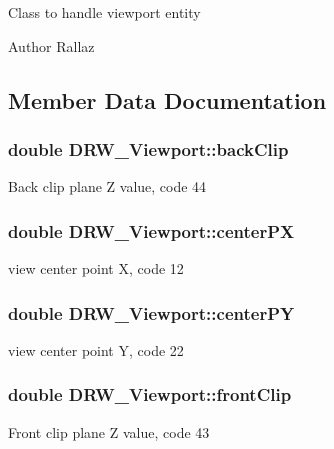 Class to handle viewport entity \begin{DoxyAuthor}{Author}
Rallaz 
\end{DoxyAuthor}


\subsection{Member Data Documentation}
\hypertarget{class_d_r_w___viewport_ac43573ecf6007bc2a5223465ab0d3dc0}{}
\subsubsection[{back\+Clip}]{\setlength{\rightskip}{0pt plus 5cm}double D\+R\+W\+\_\+\+Viewport\+::back\+Clip}\label{class_d_r_w___viewport_ac43573ecf6007bc2a5223465ab0d3dc0}
Back clip plane Z value, code 44 \hypertarget{class_d_r_w___viewport_a345ae2f37484ce99a63b0a62444a80e9}{}
\subsubsection[{center\+P\+X}]{\setlength{\rightskip}{0pt plus 5cm}double D\+R\+W\+\_\+\+Viewport\+::center\+P\+X}\label{class_d_r_w___viewport_a345ae2f37484ce99a63b0a62444a80e9}
view center point X, code 12 \hypertarget{class_d_r_w___viewport_aa40e5f6095ea9641c463c71f79bc7650}{}
\subsubsection[{center\+P\+Y}]{\setlength{\rightskip}{0pt plus 5cm}double D\+R\+W\+\_\+\+Viewport\+::center\+P\+Y}\label{class_d_r_w___viewport_aa40e5f6095ea9641c463c71f79bc7650}
view center point Y, code 22 \hypertarget{class_d_r_w___viewport_ab09b16c657b284f681b10005b7a691c6}{}
\subsubsection[{front\+Clip}]{\setlength{\rightskip}{0pt plus 5cm}double D\+R\+W\+\_\+\+Viewport\+::front\+Clip}\label{class_d_r_w___viewport_ab09b16c657b284f681b10005b7a691c6}
Front clip plane Z value, code 43 \hypertarget{class_d_r_w___viewport_af462ca77d7463df5319af366846b6494}{}
